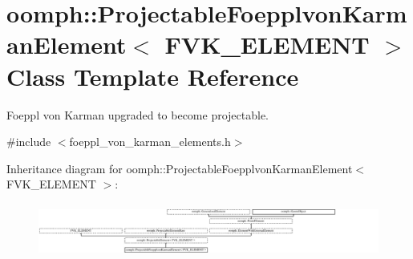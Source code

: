 \hypertarget{classoomph_1_1ProjectableFoepplvonKarmanElement}{}\section{oomph\+:\+:Projectable\+Foepplvon\+Karman\+Element$<$ F\+V\+K\+\_\+\+E\+L\+E\+M\+E\+NT $>$ Class Template Reference}
\label{classoomph_1_1ProjectableFoepplvonKarmanElement}


Foeppl von Karman upgraded to become projectable.  




{\ttfamily \#include $<$foeppl\+\_\+von\+\_\+karman\+\_\+elements.\+h$>$}

Inheritance diagram for oomph\+:\+:Projectable\+Foepplvon\+Karman\+Element$<$ F\+V\+K\+\_\+\+E\+L\+E\+M\+E\+NT $>$\+:\begin{figure}[H]
\begin{center}
\leavevmode
\includegraphics[height=1.804124cm]{classoomph_1_1ProjectableFoepplvonKarmanElement}
\end{center}
\end{figure}
